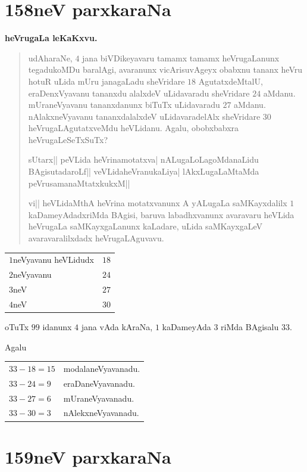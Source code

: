 \chapter{158neV parxkaraNa}

\begin{center}
{\large\bf heVrugaLa leKaKxvu.}
\end{center}

\begin{verse}
udAharaNe, $4$ jana biVDikeyavaru tamamx tamamx heVrugaLanunx
tegadukoMDu baralAgi, avaranunx vicArisuvAgeyx obabxnu tananx heVru
hotuR uLida mUru janagaLadu sheVridare $18$ AgutatxdeMtalU,
eraDenxVyavanu tananxdu alalxdeV uLidavaradu sheVridare $24$
aMdanu. mUraneVyavanu tananxdanunx biTuTx uLidavaradu $27$
aMdanu. nAlakxneVyavanu tananxdalalxdeV uLidavaradelAlx sheVridare
$30$ heVrugaLAgutatxveMdu heVLidanu. Agalu, obobxbabxra
heVrugaLeSeTxSuTx?

sUtarx|| peVLida heVrinamotatxva| nALugaLoLagoMdanaLidu
BAgisutadaroLf|| veVLidaheVranukaLiya| lAkxLugaLaMtaMda
peVrusamanaMtatxkukxM|| 

vi|| heVLidaMthA heVrina motatxvanunx A yALugaLa saMKayxdalilx $1$
kaDameyAdadxriMda BAgisi, baruva labadhxvanunx avaravaru heVLida
heVrugaLa saMKayxgaLanunx kaLadare, uLida saMKayxgaLeV
avara\-varalilxdadx heVrugaLAguvavu.
\end{verse}

\begin{center}
\begin{tabular}{lr}
$1$neVyavanu heVLidudx & $18$\\[2pt]
$2$neVyavanu & $24$\\[2pt]
$3$neV & $27$\\[2pt]
$4$neV & $30$
\end{tabular}
\end{center}

oTuTx $99$ idanunx $4$ jana vAda kAraNa, $1$ kaDameyAda $3$ riMda
BAgisalu $33$.

Agalu
\begin{center}
\begin{tabular}{ll}
$33-18=15$ & modalaneVyavanadu.\\[2pt]
$33-24=9$ & eraDaneVyavanadu.\\[2pt]
$33-27=6$ & mUraneVyavanadu.\\[2pt]
$33-30=3$ & nAlekxneVyavanadu.
\end{tabular}
\end{center}


\chapter{159neV parxkaraNa}


